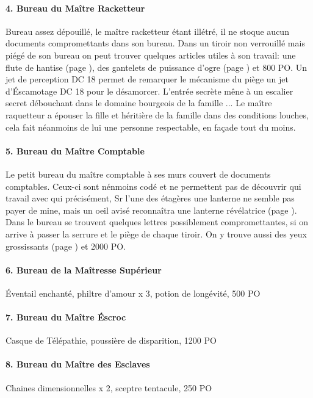 \paragraph{4. Bureau du Maître Racketteur} Bureau assez dépouillé, le maître
racketteur étant illétré, il ne stoque aucun documents compromettants dans 
son bureau. Dans un tiroir non verrouillé mais piégé de son bureau on peut 
trouver quelques articles utiles à son travail: une flute de hantise (page \pageref{}), des 
gantelets de puissance d'ogre (page \pageref{}) et 800 PO. Un jet de perception DC 18 permet
de remarquer le mécanisme du piège un jet d'Éscamotage DC 18 pour le désamorcer. 
L'entrée secrète mêne à un escalier secret débouchant dans le domaine bourgeois
de la famille ... Le maître raquetteur a épouser la fille et héritière de la famille
dans des conditions louches, cela fait néanmoins de lui une personne respectable,
en façade tout du moins.

\paragraph{5. Bureau du Maître Comptable} Le petit bureau du maître comptable
à ses murs couvert de documents comptables. Ceux-ci sont nénmoins codé et ne 
permettent pas de découvrir qui travail avec qui précisément, Sr l'une des étagères
une lanterne ne semble pas payer de mine, mais un oeil avisé reconnaîtra une 
lanterne révélatrice (page \pageref{}). Dans le bureau
se trouvent quelques lettres possiblement compromettantes, si on 
arrive à passer la serrure et le piège de chaque tiroir. On y trouve aussi
des yeux grossissants (page \pageref{}) et 2000 PO.

\paragraph{6. Bureau de la Maîtresse Supérieur}
Éventail enchanté, philtre d'amour x 3, potion de longévité, 500 PO

\paragraph{7. Bureau du Maître Éscroc}
Casque de Télépathie, poussière de disparition, 1200 PO

\paragraph{8. Bureau du Maître des Esclaves}
Chaines dimensionnelles x 2, sceptre tentacule, 250 PO

